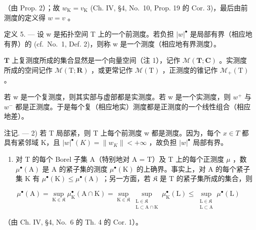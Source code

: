 （由 Prop. 2）；故 \(w_{\mathrm{K}} = v_{\mathrm{K}}\) (Ch. IV, §4, No.~10, Prop. 19 的 Cor. 3)，最后由前测度的定义得 \(w = v\) 。

定义 5. --- 设 w 是拓扑空间 T 上的一个前测度。若负担 \(|w|^{\bullet}\) 是局部有界（相应地有界）的 (cf.~No.~1, Def. 2)，则称 w 是一个测度（相应地有界测度）。

\(\mathbf{T}\) 上复测度所成的集合显然是一个向量空间（注 1），记作 \(\mathcal{M}(\mathbf{T};\mathbf{C})\) 。实测度所成的空间记作 \(\mathcal{M}(\mathrm{T};\mathbf{R})\) ，或更常记作 \(\mathcal{M}(\mathrm{T})\) ，正测度的锥记作 \(\mathcal{M}_{+}(\mathrm{T})\) 。

若 w 是一个复测度，则其实部与虚部都是实测度。若 w 是一个实测度，则 \(w^{+}\) 与 \(w^{-}\) 都是正测度。于是每个复（相应地实）测度都是正测度的一个线性组合（相应地差）。

注记. --- 2) 若 T 局部紧，则 T 上每个前测度 w 都是测度。因为，每个 \(x \in T\) 都具有紧邻域 K，且 \(|w|^{\bullet}(K) = \|w_{K}\| < +\infty\) ，故负担 \(|w|^{\bullet}\) 局部有界。

\begin{enumerate}
\def\labelenumi{\arabic{enumi})}
\setcounter{enumi}{2}
\tightlist
\item
  对 T 的每个 Borel 子集 A（特别地对 A = T）及 T 上的每个正测度 \(\mu\) ，数 \(\mu^{\bullet}(\mathrm{A})\) 是 A 的紧子集的测度 \(\mu^{\bullet}(\mathrm{K})\) 的上确界。事实上，对 A 的每个紧子集 K 有 \(\mu^{\bullet}(\mathrm{K}) \leqslant \mu^{\bullet}(\mathrm{A})\) ；另一方面，若 \(\mathfrak{K}\) 是 T 的紧子集所成的集合，则
\end{enumerate}

\[
\mu^{\bullet}(\mathrm{A}) = \sup_{\mathrm{K}\in \mathfrak{K}}\mu_{\mathrm{K}}^{\bullet}(\mathrm{A}\cap \mathrm{K}) = \sup_{\mathrm{K}\in \mathfrak{K}}\sup_{\substack{\mathrm{L}\in \mathfrak{K}\\ \mathrm{L}\subset \mathrm{A}\cap \mathrm{K}}}\mu_{\mathrm{K}}^{\bullet}(\mathrm{L})\leqslant \sup_{\substack{\mathrm{L}\in \mathfrak{K}\\ \mathrm{L}\subset \mathrm{A}}}\mu^{\bullet}(\mathrm{L})
\]

（由 Ch. IV, §4, No.~6 的 Th. 4 的 Cor. 1）。

